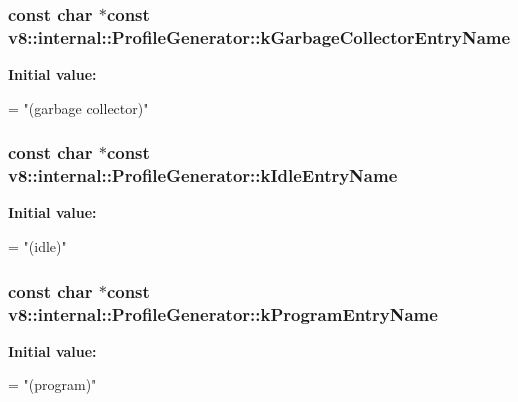 \subsubsection[{\texorpdfstring{k\+Garbage\+Collector\+Entry\+Name}{kGarbageCollectorEntryName}}]{\setlength{\rightskip}{0pt plus 5cm}const char $\ast$const v8\+::internal\+::\+Profile\+Generator\+::k\+Garbage\+Collector\+Entry\+Name\hspace{0.3cm}{\ttfamily [static]}}\hypertarget{classv8_1_1internal_1_1_profile_generator_ad28e87812af663a735d2dc3352729ea4}{}\label{classv8_1_1internal_1_1_profile_generator_ad28e87812af663a735d2dc3352729ea4}
{\bfseries Initial value\+:}
\begin{DoxyCode}
=
    \textcolor{stringliteral}{"(garbage collector)"}
\end{DoxyCode}
\subsubsection[{\texorpdfstring{k\+Idle\+Entry\+Name}{kIdleEntryName}}]{\setlength{\rightskip}{0pt plus 5cm}const char $\ast$const v8\+::internal\+::\+Profile\+Generator\+::k\+Idle\+Entry\+Name\hspace{0.3cm}{\ttfamily [static]}}\hypertarget{classv8_1_1internal_1_1_profile_generator_acbcf8250b34c83cba20f8d7d29e33ee9}{}\label{classv8_1_1internal_1_1_profile_generator_acbcf8250b34c83cba20f8d7d29e33ee9}
{\bfseries Initial value\+:}
\begin{DoxyCode}
=
    \textcolor{stringliteral}{"(idle)"}
\end{DoxyCode}
\subsubsection[{\texorpdfstring{k\+Program\+Entry\+Name}{kProgramEntryName}}]{\setlength{\rightskip}{0pt plus 5cm}const char $\ast$const v8\+::internal\+::\+Profile\+Generator\+::k\+Program\+Entry\+Name\hspace{0.3cm}{\ttfamily [static]}}\hypertarget{classv8_1_1internal_1_1_profile_generator_a5c858e88eaf2ce61922e772d7917b94a}{}\label{classv8_1_1internal_1_1_profile_generator_a5c858e88eaf2ce61922e772d7917b94a}
{\bfseries Initial value\+:}
\begin{DoxyCode}
=
    \textcolor{stringliteral}{"(program)"}
\end{DoxyCode}
